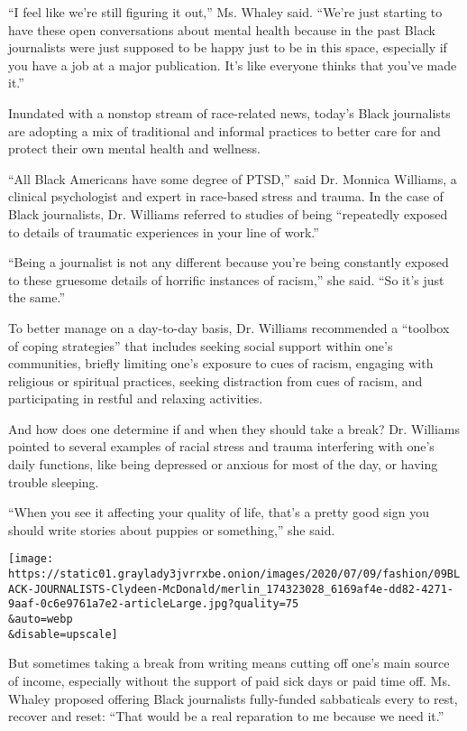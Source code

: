 ``I feel like we're still figuring it out,'' Ms. Whaley said. ``We're
just starting to have these open conversations about mental health
because in the past Black journalists were just supposed to be happy
just to be in this space, especially if you have a job at a major
publication. It's like everyone thinks that you've made it.''

Inundated with a nonstop stream of race-related news, today's Black
journalists are adopting a mix of traditional and informal practices to
better care for and protect their own mental health and wellness.

``All Black Americans have some degree of PTSD,'' said Dr. Monnica
Williams, a clinical psychologist and expert in race-based stress and
trauma. In the case of Black journalists, Dr. Williams referred to
studies of being ``repeatedly exposed to details of traumatic
experiences in your line of work.''

``Being a journalist is not any different because you're being
constantly exposed to these gruesome details of horrific instances of
racism,'' she said. ``So it's just the same.''

To better manage on a day-to-day basis, Dr. Williams recommended a
``toolbox of coping strategies'' that includes seeking social support
within one's communities, briefly limiting one's exposure to cues of
racism, engaging with religious or spiritual practices, seeking
distraction from cues of racism, and participating in restful and
relaxing activities.

And how does one determine if and when they should take a break? Dr.
Williams pointed to several examples of racial stress and trauma
interfering with one's daily functions, like being depressed or anxious
for most of the day, or having trouble sleeping.

``When you see it affecting your quality of life, that's a pretty good
sign you should write stories about puppies or something,'' she said.

\texttt{[image: https://static01.graylady3jvrrxbe.onion/images/2020/07/09/fashion/09BLACK-JOURNALISTS-Clydeen-McDonald/merlin\_174323028\_6169af4e-dd82-4271-9aaf-0c6e9761a7e2-articleLarge.jpg?quality=75\\\&auto=webp\\\&disable=upscale]}

But sometimes taking a break from writing means cutting off one's main
source of income, especially without the support of paid sick days or
paid time off. Ms. Whaley proposed offering Black journalists
fully-funded sabbaticals every to rest, recover and reset: ``That would
be a real reparation to me because we need it.''

